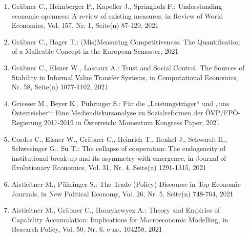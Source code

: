 \begin{enumerate}
	 \item Gräbner C., Heimberger P., Kapeller J., Springholz F.: Understanding economic openness: A review of existing measures, in Review of World Economics, Vol. 157, Nr. 1, Seite(n) 87-120, 2021
	 \item Gräbner C., Hager T.: (Mis)Measuring Competitiveness:  The Quantification of a Malleable Concept in the European Semester, 2021
	 \item Gräbner C., Elsner W., Lascaux A.: Trust and Social Control. The Sources of Stability in Informal Value Transfer Systems, in Computational Economics, Nr. 58, Seite(n) 1077-1102, 2021
	 \item Griesser M., Beyer K., Pühringer S.: Für die „Leistungsträger“ und „uns Österreicher“: Eine Mediendiskursanalyse zu Sozialreformen der ÖVP/FPÖ-Regierung 2017-2019 in Österreich: Momentum Kongress Paper, 2021
	 \item Cordes C., Elsner W., Gräbner C., Heinrich T., Henkel J., Schwardt H., Schwesinger G., Su T.: The collapse of cooperation: The endogeneity of institutional break-up and its asymmetry with emergence, in Journal of Evolutionary Economics, Vol. 31, Nr. 4, Seite(n) 1291-1315, 2021
	 \item Aistleitner M., Pühringer S.: The Trade (Policy) Discourse in Top Economic Journals, in New Political Economy, Vol. 26, Nr. 5, Seite(n) 748-764, 2021
	 \item Aistleitner M., Gräbner C., Hornykewycz A.: Theory and Empirics of Capability Accumulation: Implications for Macroeconomic Modelling, in Research Policy, Vol. 50, Nr. 6, e-no. 104258, 2021
\end{enumerate}
